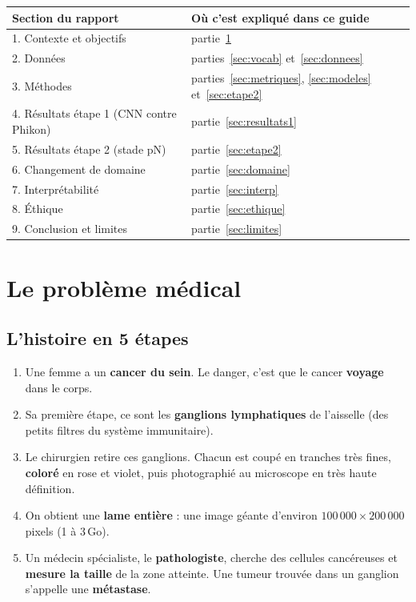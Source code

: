 \documentclass[11pt,a4paper]{article}
\begin{document}
\begin{table}[H]
\centering\small
\begin{tabularx}{\textwidth}{lX}
\toprule
\textbf{Section du rapport} & \textbf{Où c'est expliqué dans ce guide} \\
\midrule
1. Contexte et objectifs & partie~\ref{sec:medical} \\
2. Données & parties~\ref{sec:vocab} et~\ref{sec:donnees} \\
3. Méthodes & parties~\ref{sec:metriques}, \ref{sec:modeles} et~\ref{sec:etape2} \\
4. Résultats étape 1 (CNN contre Phikon) & partie~\ref{sec:resultats1} \\
5. Résultats étape 2 (stade pN) & partie~\ref{sec:etape2} \\
6. Changement de domaine & partie~\ref{sec:domaine} \\
7. Interprétabilité & partie~\ref{sec:interp} \\
8. Éthique & partie~\ref{sec:ethique} \\
9. Conclusion et limites & partie~\ref{sec:limites} \\
\bottomrule
\end{tabularx}
\end{table}

\tableofcontents
\newpage

\section{Le problème médical}\label{sec:medical}

\subsection{L'histoire en 5 étapes}
\begin{enumerate}
  \item Une femme a un \textbf{cancer du sein}. Le danger, c'est que le cancer \textbf{voyage} dans le corps.
  \item Sa première étape, ce sont les \textbf{ganglions lymphatiques} de l'aisselle (des petits filtres du système immunitaire).
  \item Le chirurgien retire ces ganglions. Chacun est coupé en tranches très fines, \textbf{coloré} en rose et violet, puis
        photographié au microscope en très haute définition.
  \item On obtient une \textbf{lame entière} : une image géante d'environ $100\,000\times200\,000$ pixels (1 à 3\,Go).
  \item Un médecin spécialiste, le \textbf{pathologiste}, cherche des cellules cancéreuses et \textbf{mesure la taille} de la zone
        atteinte. Une tumeur trouvée dans un ganglion s'appelle une \textbf{métastase}.
\end{enumerate}
\end{document}
